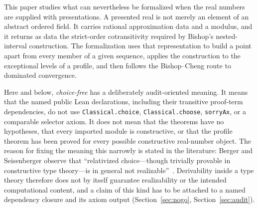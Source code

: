 \documentclass[11pt]{article}
\theoremstyle{definition}
\theoremstyle{remark}
\begin{document}
This paper studies what can nevertheless be formalized when the real numbers are supplied with presentations.  A presented real is not merely an element of an abstract ordered field.  It carries rational approximation data and a modulus, and it returns as data the strict-order cotransitivity required by Bishop's nested-interval construction.  The formalization uses that representation to build a point apart from every member of a given sequence, applies the construction to the exceptional levels of a profile, and then follows the Bishop--Cheng route to dominated convergence.

Here and below, \emph{choice-free} has a deliberately audit-oriented meaning.  It means that the named public Lean declarations, including their transitive proof-term dependencies, do not use \texttt{Classical.choice}, \texttt{Classical.choose}, \texttt{sorryAx}, or a comparable selector axiom.  It does not mean that the theorems have no hypotheses, that every imported module is constructive, or that the profile theorem has been proved for every possible constructive real-number object.  The reason for fixing the meaning this narrowly is stated in the literature: Berger and Seisenberger observe that ``relativized choice---though trivially provable in constructive type theory---is in general not realizable''~\cite[\S29.5]{berger-seisenberger-2023}.  Derivability inside a type theory therefore does not by itself guarantee realizability or the intended computational content, and a claim of this kind has to be attached to a named dependency closure and its axiom output (Section~\ref{sec:nogo}, Section~\ref{sec:audit}).
\end{document}
